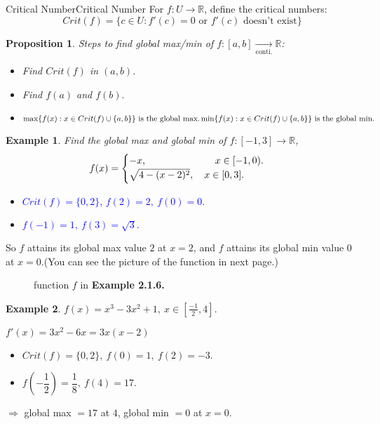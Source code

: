 \documentclass[12pt,a4paper]{article}
\newcommand{\R}{\mathbb{R}}
\theoremstyle{mystyle}
\numberwithin{figure}{subsection}
\newtheorem{exm}{Example}[subsection] %
\newtheorem{prp}{Proposition}[subsection] %
\newenvironment{ex}{\begin{exBox}\begin{exm}}{\end{exm}\end{exBox}}
\newenvironment{prop}{\begin{prpBox}\begin{prp}}{\end{prp}\end{prpBox}}
\begin{document}
\begin{df}{Critical Number}{Critical Number}
    For $f: U \longrightarrow \R$, define the critical numbers:
    \[
    Crit(f)=\{c \in U: f'(c)=0\text{ or }f'(c) \text{ doesn't exist}\}
    \]
\end{df}
\begin{prop}
Steps to find global max/min of $f: [a,b] \underset{\text{conti.}}{\longrightarrow} \mathbb{R}$:
\begin{itemize}
    \item[1)] Find $Crit(f)$ in $(a,b).$
    \item[2)] Find $f(a)$ and $f(b).$
    \item[3)] 
    $\max\{f(x): x \in Crit(f) \cup \{a,b\}\} \text{ is the global max.}\\
    \vspace{2pt}
    \min\{f(x): x \in Crit(f) \cup \{a,b\}\} \text{ is the global min.}$
\end{itemize}
\end{prop}
\begin{ex}
    Find the global max and global min of $f:[-1,3] \longrightarrow \R$,
    \[
    f(x) = \begin{cases}
    -x, \hspace{70pt} x \in [-1,0). \\
    \vspace{2pt}
    \sqrt{4-(x-2)^2}, \quad x\in [0,3].
    \end{cases}
    \]
\end{ex}
\begin{itemize}
    \item[\textcolor{blue}{1)}] \textcolor{blue}{$Crit(f) = \{0,2\}$, $f(2)=2, \ f(0) = 0.$}
    \item[\textcolor{blue}{2)}]
    \textcolor{blue}{$f(-1)=1, \ f(3)=\sqrt{3}.$}
\end{itemize}
So $f$ attains its global max value $2$ at $x=2$, and $f$ attains its global min value $0$ at $x=0.$(You can see the picture of the function in next page.)
\begin{figure}[t]
    \centering
    
    \caption{function $f$ in \textbf{Example 2.1.6.}}
    \label{fig:4.1.2}
\end{figure}
\begin{ex}
    $f(x)=x^3-3x^2+1, \ x \in [\frac{-1}{2},4].$
\end{ex}
$f'(x)=3x^2-6x=3x(x-2)$
\begin{itemize}
    \item [1)] $Crit(f) = \{0,2\}, \ f(0)=1, \ f(2)=-3.$
    \item [2)] $f\left(-\dfrac{1}{2}\right) =\dfrac{1}{8}, \ f(4) = 17.$
\end{itemize}
$\Rightarrow$ global max $=17$ at $4$, global min $=0$ at $x=0.$
\newpage
\end{document}
